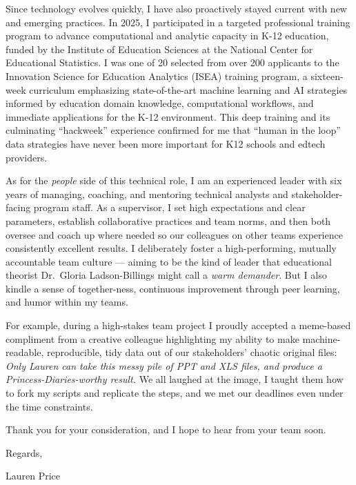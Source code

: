 \documentclass[
  letterpaper,
  DIV=11,
  numbers=noendperiod]{scrartcl}
\begin{document}
Since technology evolves quickly, I have also proactively stayed current
with new and emerging practices. In 2025, I participated in a targeted
professional training program to advance computational and analytic
capacity in K-12 education, funded by the Institute of Education
Sciences at the National Center for Educational Statistics. I was one of
20 selected from over 200 applicants to the Innovation Science for
Education Analytics (ISEA) training program, a sixteen-week curriculum
emphasizing state-of-the-art machine learning and AI strategies informed
by education domain knowledge, computational workflows, and immediate
applications for the K-12 environment. This deep training and its
culminating ``hackweek'' experience confirmed for me that ``human in the
loop'' data strategies have never been more important for K12 schools
and edtech providers.

As for the \emph{people} side of this technical role, I am an
experienced leader with six years of managing, coaching, and mentoring
technical analysts and stakeholder-facing program staff. As a
supervisor, I set high expectations and clear parameters, establish
collaborative practices and team norms, and then both oversee and coach
up where needed so our colleagues on other teams experience consistently
excellent results. I deliberately foster a high-performing, mutually
accountable team culture --- aiming to be the kind of leader that
educational theorist Dr.~Gloria Ladson-Billings might call a \emph{warm
demander}. But I also kindle a sense of together-ness, continuous
improvement through peer learning, and humor within my teams.

For example, during a high-stakes team project I proudly accepted a
meme-based compliment from a creative colleague highlighting my ability
to make machine-readable, reproducible, tidy data out of our
stakeholders' chaotic original files: \emph{Only Lauren can take this
messy pile of PPT and XLS files, and produce a Princess-Diaries-worthy
result.} We all laughed at the image, I taught them how to fork my
scripts and replicate the steps, and we met our deadlines even under the
time constraints.

Thank you for your consideration, and I hope to hear from your team
soon.

\vspace{12pt}

Regards,

Lauren Price
\end{document}
